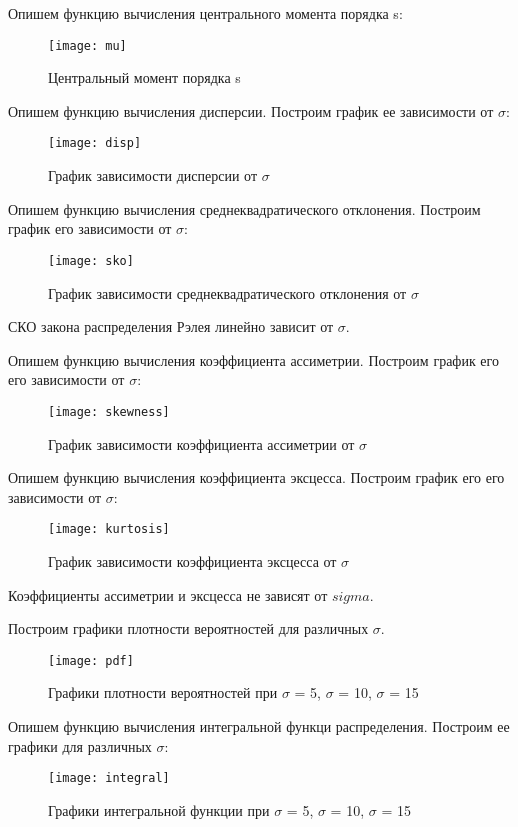 \documentclass[a4paper,14pt]{extarticle}
\begin{document}
Опишем функцию вычисления центрального момента порядка s:
\begin{figure}[H]
    \centering
    \texttt{[image: mu]}
    \caption{Центральный момент порядка s}
    \label{fig:mu}
\end{figure}

Опишем функцию вычисления дисперсии. Построим график ее зависимости от $\sigma$:
\begin{figure}[H]
    \centering
    \texttt{[image: disp]}
    \caption{График зависимости дисперсии от $\sigma$}
    \label{fig:disp}
\end{figure}

Опишем функцию вычисления среднеквадратического отклонения. Построим график
его зависимости от $\sigma$:
\begin{figure}[H]
    \centering
    \texttt{[image: sko]}
    \caption{График зависимости среднеквадратического отклонения от $\sigma$}
    \label{fig:sko}
\end{figure}

СКО закона распределения Рэлея линейно зависит от $\sigma$.

Опишем функцию вычисления коэффициента ассиметрии. Построим график его
его зависимости от $\sigma$:
\begin{figure}[H]
    \centering
    \texttt{[image: skewness]}
    \caption{График зависимости коэффициента ассиметрии от $\sigma$}
    \label{fig:skewness}
\end{figure}

Опишем функцию вычисления коэффициента эксцесса. Построим график его
его зависимости от $\sigma$:
\begin{figure}[H]
    \centering
    \texttt{[image: kurtosis]}
    \caption{График зависимости коэффициента эксцесса от $\sigma$}
    \label{fig:kurtosis}
\end{figure}

Коэффициенты ассиметрии и эксцесса не зависят от $sigma$.

Построим графики плотности вероятностей для различных $\sigma$.
\begin{figure}[H]
    \centering
    \texttt{[image: pdf]}
    \caption{Графики плотности вероятностей при $\sigma$ = 5, $\sigma$ = 10, $\sigma$ = 15}
    \label{fig:pdf}
\end{figure}

Опишем функцию вычисления интегральной функци распределения.
Построим ее графики для различных $\sigma$:
\begin{figure}[H]
    \centering
    \texttt{[image: integral]}
    \caption{Графики интегральной функции при $\sigma$ = 5, $\sigma$ = 10, $\sigma$ = 15}
    \label{fig:integral}
\end{figure}
\end{document}
